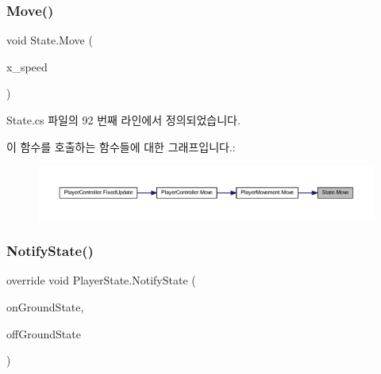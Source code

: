 \mbox{\label{class_state_a4424d0f582fe05b9dc7cec2a0a7c735a}} 
\subsubsection{\texorpdfstring{Move()}{Move()}}
{\footnotesize\ttfamily void State.\+Move (\begin{DoxyParamCaption}\item[{float}]{x\+\_\+speed }\end{DoxyParamCaption})\hspace{0.3cm}{\ttfamily [inherited]}}



State.\+cs 파일의 92 번째 라인에서 정의되었습니다.


\begin{DoxyCode}{0}

\end{DoxyCode}
이 함수를 호출하는 함수들에 대한 그래프입니다.\+:
\nopagebreak
\begin{figure}[H]
\begin{center}
\leavevmode
\includegraphics[width=350pt]{d0/d8b/class_state_a4424d0f582fe05b9dc7cec2a0a7c735a_icgraph}
\end{center}
\end{figure}
\mbox{\label{class_player_state_a59f3f64c24ba1b6e34e34cb23746ecb0}} 
\subsubsection{\texorpdfstring{NotifyState()}{NotifyState()}\hspace{0.1cm}{\footnotesize\ttfamily [1/2]}}
{\footnotesize\ttfamily override void Player\+State.\+Notify\+State (\begin{DoxyParamCaption}\item[{\mbox{\hyperlink{class_state_ab9eb1c1d81f1903b8486d1275e78b68e}{On\+Ground}}}]{on\+Ground\+State,  }\item[{\mbox{\hyperlink{class_state_a7d945e793324c017a973205564cf1a56}{Off\+Ground}}}]{off\+Ground\+State }\end{DoxyParamCaption})\hspace{0.3cm}{\ttfamily [virtual]}}



